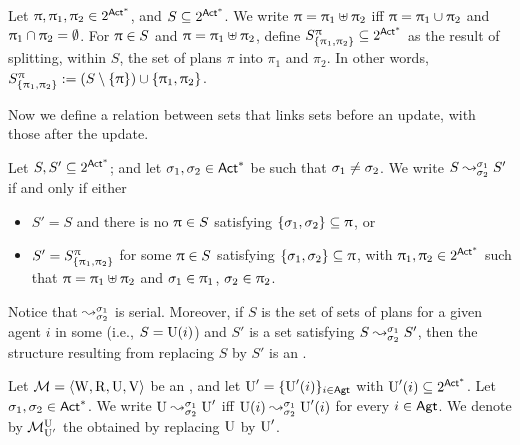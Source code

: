 
\medskip

\begin{definition}
Let $\plans, \plans_1, \plans_2 \in 2^{\ACT^*}$, and $S \subseteq 2^{\ACT^*}$.  We write $\plans = \plans_1\uplus\plans_2$ iff $\plans=\plans_1\cup\plans_2$ and $\plans_1\cap\plans_2=\emptyset$.
For $\plans \in S$ and $\plans=\plans_1\uplus\plans_2$, define  $\lmodel{S}{\plans}{\set{\plans_1,\plans_2}} \subseteq 2^{\ACT^*}$ as the result of splitting, within $S$, the set of plans $\pi$ into $\pi_1$ and $\pi_2$. In other words, $\lmodel{S}{\plans}{\set{\plans_1,\plans_2}} := (S\setminus\set{\plans})\cup\set{\plans_1,\plans_2}$.
\end{definition}

\medskip

Now we define a relation between sets that links sets before an update, with those after the update.

\medskip

\begin{definition}\label{def:splitstr}
Let $S,S' \subseteq 2^{\ACT^*}$; and let $\plan_1,\plan_2 \in \ACT^*$ be such that $\plan_1\neq\plan_2$.
We write $\splitstr{S}{S'}{\plan_1}{\plan_2}$ if and only if either
\begin{itemize} \itemsep 0cm
\item $S' = S$ and there is no $\plans\in S$ satisfying $\set{\plan_1, \plan_2} \subseteq \plans$, or
\item $S' = \lmodel{S}{\plans}{\set{\plans_1,\plans_2}}$ for some $\plans \in S$ satisfying $\set{\plan_1, \plan_2} \subseteq \plans$, with $\plans_1, \plans_2 \in 2^{\ACT^*}$ such that
$\plans = \plans_1\uplus\plans_2$ and
$\plan_1 \in \plans_1$, $\plan_2 \in \plans_2$.
\end{itemize}
\end{definition}

\medskip

Notice that $\splitstr{}{}{\plan_1}{\plan_2}$ is serial. Moreover, if $S$ is the set of sets of plans for a given agent $i$ in some \ults (i.e., $S=\Unc(i)$) and $S'$ is a set satisfying $\splitstr{S}{S'}{\plan_1}{\plan_2}$, then the structure resulting from replacing $S$ by $S'$ is an \ults.

\medskip

\begin{definition}
Let $\modults=\tup{\W,\R,\Unc,\V}$ be an \ults, and let $\Unc'=\set{\Unc'(i)}_{i\in\AGT}$ with ${\Unc'(i)\subseteq 2^{\ACT^*}}$.
Let $\plan_1,\plan_2 \in \ACT^*$. We write $\splitstr{\Unc}{\Unc'}{\plan_1}{\plan_2}$ iff $\splitstr{\Unc(i)}{\Unc'(i)}{\plan_1}{\plan_2}$ for every $i\in\AGT$.
We denote by $\modults^{\Unc}_{\Unc'}$ the \ults obtained by replacing $\Unc$ by $\Unc'$.
\end{definition}

